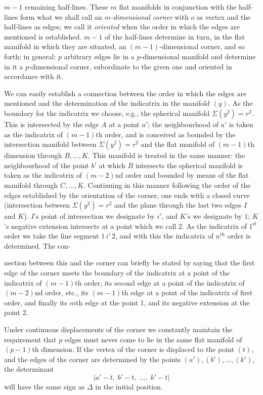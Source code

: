 \documentclass{article}
\begin{document}
$m - 1$ remaining half-lines. These $m$ flat manifolds in conjunction with the half-lines form what we shall call an \emph{$m$-dimensional corner} with $o$ as vertex and the half-lines as edges; we call it \emph{oriented} when the order in which the edges are mentioned is established. $m - 1$ of the half-lines determine in turn, in the flat manifold in which they are situated, an $(m - 1)$-dimensional corner, and so forth; in general: $p$ arbitrary edges lie in a $p$-dimensional manifold and determine in it a $p$-dimensional corner, subordinate to the given one and oriented in accordance with it.

We can easily establish a connection between the order in which the edges are mentioned and the determination of the indicatrix in the manifold $(y)$. As the boundary for the indicatrix we choose, e.g., the spherical manifold $\Sigma(y^2) = r^2$. This is intersected by the edge $A$ at a point $a'$; the neighbourhood of $a'$ is taken as the indicatrix of $(m - 1)$th order, and is conceived as bounded by the intersection manifold between $\Sigma(y^2) = r^2$ and the flat manifold of $(m - 1)$th dimension through $B, \dots, K$. This manifold is treated in the same manner: the neighbourhood of the point $b'$ at which $B$ intersects the spherical manifold is taken as the indicatrix of $(m - 2)$nd order and bounded by means of the flat manifold through $C, \dots, K$. Continuing in this manner following the order of the edges established by the orientation of the corner, one ends with a closed curve (intersection between $\Sigma(y^2) = r^2$ and the plane through the last two edges $I$ and $K$). $I$'s point of intersection we designate by $i'$, and $K$'s we designate by $1$; $K$'s negative extension intersects at a point which we call $2$. As the indicatrix of $1^{\text{st}}$ order we take the line segment $1\,i'\,2$, and with this the indicatrix of $n^{\text{th}}$ order is determined. The con-

nection between this and the corner can briefly be stated by saying that the first edge of the corner meets the boundary of the indicatrix at a point of the indicatrix of $(m - 1)$th order, its second edge at a point of the indicatrix of $(m - 2)$nd order, etc., its $(m - 1)$th edge at a point of the indicatrix of first order, and finally its $m$th edge at the point 1, and its negative extension at the point 2.

Under continuous displacements of the corner we constantly maintain the requirement that $p$ edges must never come to lie in the same flat manifold of $(p - 1)$th dimension. If the vertex of the corner is displaced to the point $(t)$, and the edges of the corner are determined by the points $(a'), (b'), \dots, (k')$, the determinant
\[
|a' - t, \; b' - t, \; \dots, \; k' - t|
\]
will have the same sign as $\Delta$ in the initial position.
\end{document}

